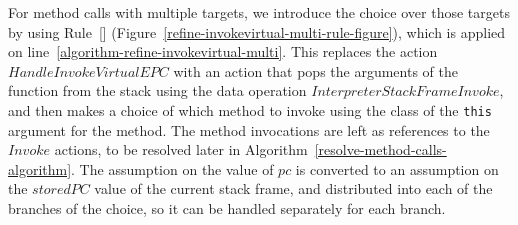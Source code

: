For method calls with multiple targets, we introduce the choice over
those targets by using
Rule~[]
(Figure~\ref{refine-invokevirtual-multi-rule-figure}), which is
applied on line~\ref{algorithm-refine-invokevirtual-multi}.
This replaces the action $HandleInvokeVirtualEPC$ with an action that
pops the arguments of the function from the stack using the data
operation $InterpreterStackFrameInvoke$, and then makes a choice of
which method to invoke using the class of the \texttt{this} argument
for the method.
The method invocations are left as references to the $Invoke$ actions,
to be resolved later in
Algorithm~\ref{resolve-method-calls-algorithm}.
The assumption on the value of $pc$ is converted to an assumption on
the $storedPC$ value of the current stack frame, and distributed into
each of the branches of the choice, so it can be handled separately
for each branch.
